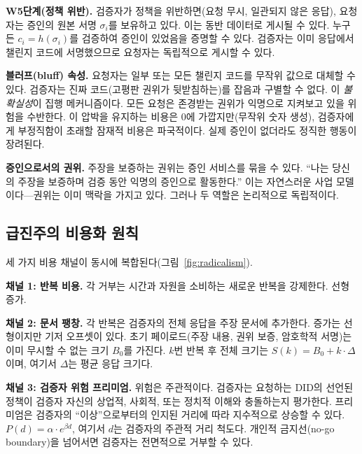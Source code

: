 \documentclass[11pt,a4paper,twocolumn]{article}
\begin{document}
\textbf{W5단계(정책 위반).} 검증자가 정책을 위반하면(요청 무시, 일관되지 않은 응답), 요청자는 증인의 원본 서명 $\sigma_i$를 보유하고 있다. 이는 동반 데이터로 게시될 수 있다. 누구든 $c_i = h(\sigma_i)$를 검증하여 증인이 있었음을 증명할 수 있다. 검증자는 이미 응답에서 챌린지 코드에 서명했으므로 요청자는 독립적으로 게시할 수 있다.

\textbf{블러프(bluff) 속성.} 요청자는 일부 또는 모든 챌린지 코드를 무작위 값으로 대체할 수 있다. 검증자는 진짜 코드(고평판 권위가 뒷받침하는)를 잡음과 구별할 수 없다. 이 \emph{불확실성}이 집행 메커니즘이다. 모든 요청은 존경받는 권위가 익명으로 지켜보고 있을 위험을 수반한다. 이 압박을 유지하는 비용은 0에 가깝지만(무작위 숫자 생성), 검증자에게 부정직함이 초래할 잠재적 비용은 파국적이다. 실제 증인이 없더라도 정직한 행동이 장려된다.

\textbf{증인으로서의 권위.} 주장을 보증하는 권위는 증인 서비스를 묶을 수 있다. ``나는 당신의 주장을 보증하며 검증 동안 익명의 증인으로 활동한다.'' 이는 자연스러운 사업 모델이다---권위는 이미 맥락을 가지고 있다. 그러나 두 역할은 논리적으로 독립적이다.

\subsection{급진주의 비용화 원칙}

세 가지 비용 채널이 동시에 복합된다(그림~\ref{fig:radicalism}).

\textbf{채널 1: 반복 비용.} 각 거부는 시간과 자원을 소비하는 새로운 반복을 강제한다. 선형 증가.

\textbf{채널 2: 문서 팽창.} 각 반복은 검증자의 전체 응답을 주장 문서에 추가한다. 증가는 선형이지만 기저 오프셋이 있다. 초기 페이로드(주장 내용, 권위 보증, 암호학적 서명)는 이미 무시할 수 없는 크기 $B_0$를 가진다. $k$번 반복 후 전체 크기는 $S(k) = B_0 + k \cdot \Delta$이며, 여기서 $\Delta$는 평균 응답 크기다.

\textbf{채널 3: 검증자 위험 프리미엄.} 위험은 주관적이다. 검증자는 요청하는 DID의 선언된 정책이 검증자 자신의 상업적, 사회적, 또는 정치적 이해와 충돌하는지 평가한다. 프리미엄은 검증자의 ``이상''으로부터의 인지된 거리에 따라 지수적으로 상승할 수 있다. $P(d) = \alpha \cdot e^{\beta d}$, 여기서 $d$는 검증자의 주관적 거리 척도다. 개인적 금지선(no-go boundary)을 넘어서면 검증자는 전면적으로 거부할 수 있다.
\end{document}
